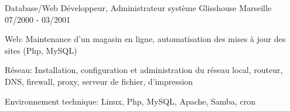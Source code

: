 \begin{cventries}
  \cventry
    {Database/Web Développeur, Administrateur système}
    {Glisshouse}
    {Marseille}
    {07/2000 - 03/2001}
    {
      \begin{cvitems}
        \item {Web: Maintenance d'un magasin en ligne, automatisation des mises à jour des sites (Php, MySQL)}
        \item {Réseau: Installation, configuration et administration du réseau local, routeur, DNS, firewall, proxy, serveur de fichier, d'impression}
		\item {Environnement technique: Linux, Php, MySQL, Apache, Samba, cron}
      \end{cvitems}
    }

\end{cventries}

